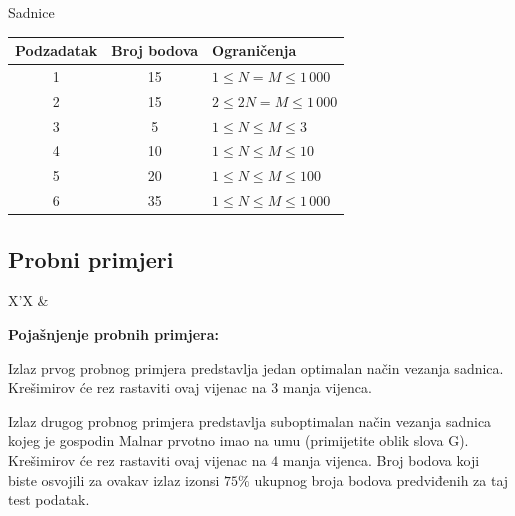 \begin{statement}[
  problempoints=100,
  timelimit=3 sekunde,
  memorylimit=512 MiB,
]{Sadnice}
{\renewcommand{\arraystretch}{1.4}
  \setlength{\tabcolsep}{6pt}
  \begin{tabular}{ccl}
 Podzadatak & Broj bodova & Ograničenja \\ \midrule
  1 & 15 & $1 \le N = M \le 1\,000$ \\
  2 & 15 & $2 \le 2N = M \le 1\,000$ \\
  3 & 5 & $1 \le N \le M \le 3$ \\
  4 & 10 & $1 \le N \le M \le 10$ \\
  5 & 20 & $1 \le N \le M \le 100$ \\
  6 & 35 & $1 \le N \le M \le 1\,000$ \\
\end{tabular}}

\subsection*{Probni primjeri}
\begin{tabularx}{\textwidth}{X'X}
 &
\end{tabularx}

\textbf{Pojašnjenje probnih primjera:}

Izlaz prvog probnog primjera predstavlja jedan optimalan način vezanja
sadnica. Krešimirov će rez rastaviti ovaj vijenac na $3$ manja vijenca.

Izlaz drugog probnog primjera predstavlja suboptimalan način vezanja
sadnica kojeg je gospodin Malnar prvotno imao na umu (primijetite oblik
slova G). Krešimirov će rez rastaviti ovaj vijenac na $4$ manja vijenca.
Broj bodova koji biste osvojili za ovakav izlaz izonsi $75\%$ ukupnog
broja bodova predviđenih za taj test podatak.

\end{statement}


